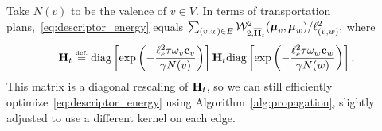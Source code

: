 Take $N(v)$ to be the valence of $v\in V$.  In terms of transportation plans,~\eqref{eq:descriptor_energy} equals $\sum_{(v,w)\in E} \mathcal W^2_{2,{\overline{\mathbf{H}}}_t}(\boldsymbol{\mu}_v,\boldsymbol{\mu}_w)/\ell^2_{(v,w)},$ where
$$
{\overline\kernelH}_t \eqdef
\textrm{diag}\left[\exp\left(
-\frac{\ell_e^2\tau\omega_v\cc_v}{\gamma N(v)}
\right)\right]
 \kernel
\textrm{diag}\left[\exp\left(
-\frac{\ell_e^2\tau\omega_w\cc_w}{\gamma N(w)}
\right)\right].
$$
This matrix is a diagonal rescaling of $\mathbf{H}_t$, so we can still efficiently optimize~\eqref{eq:descriptor_energy} using Algorithm~\ref{alg:propagation}, slightly adjusted to use a different kernel on each edge.
%
